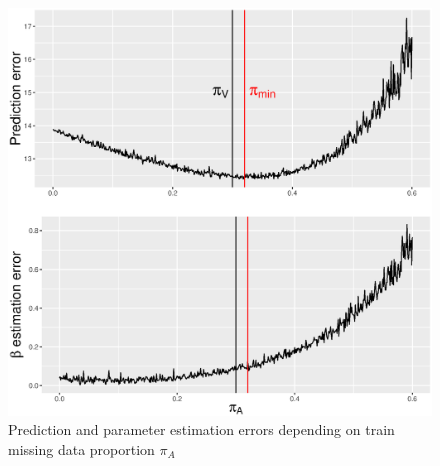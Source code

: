\begin{figure}[H]
	\centering
   \includegraphics[scale=0.4]{Resources/miss_impact3_simu}
   \caption{Prediction and parameter estimation errors depending on train missing data proportion $\pi_A$}
   \label{fig.miss_impact3_simu}
\end{figure}